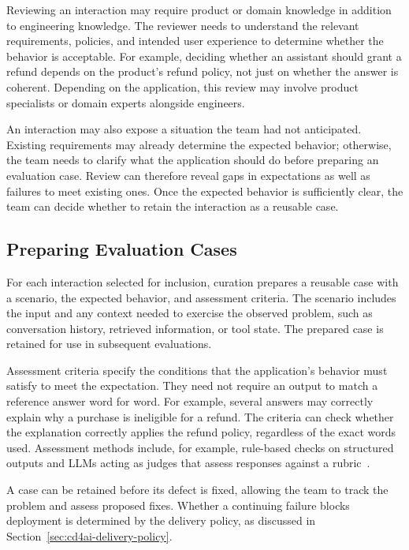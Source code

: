 Reviewing an interaction may require product or domain knowledge in addition
to engineering knowledge. The reviewer needs to understand the relevant
requirements, policies, and intended user experience to determine whether the
behavior is acceptable. For example, deciding whether an assistant should
grant a refund depends on the product's refund policy, not just on whether
the answer is coherent. Depending on the application, this review may involve
product specialists or domain experts alongside engineers.

An interaction may also expose a situation the team had not anticipated.
Existing requirements may already determine the expected behavior; otherwise,
the team needs to clarify what the application should do before preparing an
evaluation case. Review can therefore reveal gaps in expectations as well as
failures to meet existing ones. Once the expected behavior is sufficiently
clear, the team can decide whether to retain the interaction as a reusable case.

\subsection{Preparing Evaluation Cases}

For each interaction selected for inclusion, curation prepares a reusable case
with a scenario, the expected behavior, and assessment criteria. The scenario
includes the input and any context needed to exercise the observed problem,
such as conversation history, retrieved information, or tool state. The
prepared case is retained for use in subsequent evaluations.

Assessment criteria specify the conditions that the application's behavior must
satisfy to meet the expectation. They need not require an output to match a
reference answer word for word. For example, several answers may correctly
explain why a purchase is ineligible for a refund. The criteria can check
whether the explanation correctly applies the refund policy, regardless of
the exact words used. Assessment methods include, for example, rule-based
checks on structured outputs and LLMs acting as judges that assess responses
against a rubric~\parencite{Grace:DemystifyingEvals:2026}.

A case can be retained before its defect is fixed, allowing the team to track
the problem and assess proposed fixes. Whether a continuing failure blocks
deployment is determined by the delivery policy, as discussed in
Section~\ref{sec:cd4ai-delivery-policy}.

